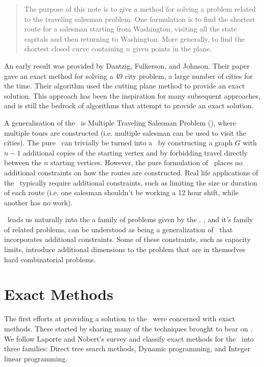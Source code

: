    \begin{quote}
   The purpose of this note is to give a method for solving a problem related to the traveling salesman problem. One formulation is to find the shortest route for a salesman starting from Washington, visiting all the state capitals and then returning to Washington. More generally, to find the shortest closed curve containing $n$ given points in the plane.
   \end{quote}

An early result was provided by Dantzig, Fulkerson, and  Johnson\cite{Dantzig:1954}. Their paper gave an exact method for solving a 49 city problem, a large number of cities for the time. Their algorithm used the cutting plane method to provide an exact solution. This approach has been the inspiration for many subsequent approaches, and is still the bedrock of algorithms that attempt to provide an exact solution.  

A generalisation of the \TSP\ is Multiple Traveling Salesman Problem (\MTSP), where multiple tours are constructed (i.e. multiple salesman can be used to visit the cities). The pure \MTSP\ can trivially be turned into a \TSP\ by constructing a graph $G$ with $n - 1$ additional copies of the starting vertex and by forbidding travel directly between the $n$ starting vertices. However, the pure formulation of \MTSP\ places no additional constraints on how the routes are constructed. Real life applications of the \MTSP\ typically require additional constraints, such as limiting the size or duration of each route (i.e. one salesman shouldn't be working a 12 hour shift, while another has no work).

\MTSP\ leads us naturally into the a family of problems given by the \VRP. \VRP, and it's family of related problems, can be understood as being a generalization of \MTSP\ that incorporates additional constraints. Some of these constraints, such as capacity limits, introduce additional dimensions to the problem that are in themselves hard combinatorial problems.

\section{Exact Methods}
\label{sec:em}

The first efforts at providing a solution to the \VRP\ were concerned with exact methods. These started by sharing many of the techniques brought to bear on \TSP. We follow Laporte and Nobert's survey\cite{LANO:87} and classify exact methods for the \VRP\ into three families: Direct tree search methods, Dynamic programming, and Integer linear programming.

